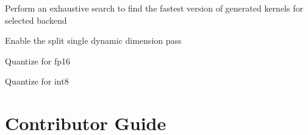 \documentclass[letterpaper,10pt,english]{sphinxmanual}
\begin{document}
\begin{fulllineitems}
\label{\detokenize{driver:cmdoption-migraphx-driver-roctx-exhaustive-tune}}
\end{fulllineitems}


\sphinxAtStartPar
Perform an exhaustive search to find the fastest version of generated kernels for selected backend

\sphinxAtStartPar
Enable the split single dynamic dimension pass

\begin{fulllineitems}
\label{\detokenize{driver:cmdoption-migraphx-driver-roctx-fp16}}
\end{fulllineitems}


\sphinxAtStartPar
Quantize for fp16

\begin{fulllineitems}
\label{\detokenize{driver:cmdoption-migraphx-driver-roctx-int8}}
\end{fulllineitems}


\sphinxAtStartPar
Quantize for int8


\chapter{Contributor Guide}
\label{\detokenize{contributor_guide:contributor-guide}}\label{\detokenize{contributor_guide::doc}}
\end{document}
